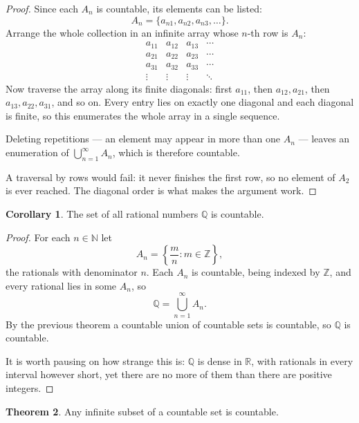 \documentclass[11pt,a4paper]{article}
\theoremstyle{definition}
\newtheorem{thm}{Theorem}[section]
\newtheorem{coro}[thm]{Corollary}
\begin{document}
\begin{proof}
Since each $A_n$ is countable, its elements can be listed:
$$A_n=\{a_{n1},a_{n2},a_{n3},\dots\}.$$
Arrange the whole collection in an infinite array whose $n$-th row is $A_n$:
$$\begin{array}{cccc}
a_{11} & a_{12} & a_{13} & \cdots\\
a_{21} & a_{22} & a_{23} & \cdots\\
a_{31} & a_{32} & a_{33} & \cdots\\
\vdots & \vdots & \vdots & \ddots
\end{array}$$
Now traverse the array along its finite diagonals: first $a_{11}$, then
$a_{12},a_{21}$, then $a_{13},a_{22},a_{31}$, and so on. Every entry lies on
exactly one diagonal and each diagonal is finite, so this enumerates the whole
array in a single sequence.

Deleting repetitions --- an element may appear in more than one $A_n$ --- leaves
an enumeration of $\bigcup_{n=1}^{\infty}A_n$, which is therefore countable.

A traversal by rows would fail: it never finishes the first row, so no element
of $A_2$ is ever reached. The diagonal order is what makes the argument work.
\end{proof}


\begin{coro}
The set of all rational numbers $\mathbb{Q}$ is countable.

\end{coro}

\begin{proof}
For each $n\in\mathbb{N}$ let
$$A_n=\left\{\frac{m}{n}: m\in\mathbb{Z}\right\},$$
the rationals with denominator $n$. Each $A_n$ is countable, being indexed by
$\mathbb{Z}$, and every rational lies in some $A_n$, so
$$\mathbb{Q}=\bigcup_{n=1}^{\infty}A_n .$$
By the previous theorem a countable union of countable sets is countable, so
$\mathbb{Q}$ is countable.

It is worth pausing on how strange this is: $\mathbb{Q}$ is dense in
$\mathbb{R}$, with rationals in every interval however short, yet there are no
more of them than there are positive integers.
\end{proof}


\begin{thm}
Any infinite subset of a countable set is countable.

\end{thm}
\end{document}
